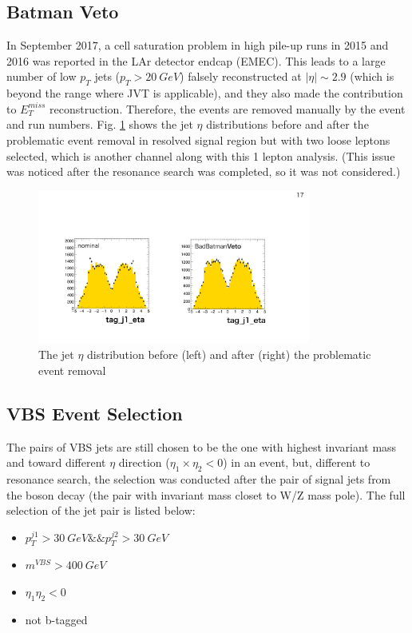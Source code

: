 \subsection{Batman Veto}
In September 2017, a cell saturation problem in high pile-up runs in 2015 and 2016 was reported in the LAr detector endcap (EMEC). This leads to a large number of low $p_{T}$ jets ($p_{T}>20~GeV$) falsely reconstructed at $|\eta|\sim 2.9$ (which is beyond the range where JVT is applicable), and they also made the contribution to $E^{miss}_{T}$ reconstruction. Therefore, the events are removed manually by the event and run numbers. Fig. \ref{Fig:batman_veto} shows the jet $\eta$ distributions before and after the problematic event removal in resolved signal region but with two loose leptons selected, which is another channel along with this 1 lepton analysis. (This issue was noticed after the resonance search was completed, so it was not considered.)
\begin{figure}[tbp]
	\begin{center}
		\includegraphics[width=0.8\textwidth,keepaspectratio]{Chapter5/SR_EtaTagResJet_BatmanVeto}
		\caption{The jet $\eta$ distribution before (left) and after (right) the problematic event removal}
		\label{Fig:batman_veto}
	\end{center}
\end{figure} 
 
\subsection{VBS Event Selection}
The pairs of VBS jets are still chosen to be the one with highest invariant mass and toward different $\eta$ direction ($\eta_1\times\eta_2<0$) in an event, but, different to resonance search, the selection was conducted after the pair of signal jets from the boson decay (the pair with invariant mass closet to W/Z mass pole). The full selection of the jet pair is listed below:
\begin{itemize}
	\item $p_{T}^{j1}>30~GeV\&\&p_{T}^{j2}>30~GeV$
	\item $m^{VBS}>400~GeV$
	\item $\eta_1\eta_2<0$
	\item not b-tagged
\end{itemize}
